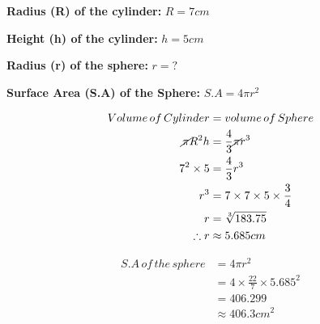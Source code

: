 \documentclass[
  a4paperpaper,
]{scrbook}
\begin{document}
\begin{tcolorbox}[enhanced jigsaw, left=2mm, colframe=quarto-callout-caution-color-frame, toptitle=1mm, opacitybacktitle=0.6, rightrule=.15mm, colbacktitle=quarto-callout-caution-color!10!white, colback=white, arc=.35mm, breakable, leftrule=.75mm, bottomtitle=1mm, bottomrule=.15mm, title=\textcolor{quarto-callout-caution-color}{\faFire}\hspace{0.5em}{Solution}, titlerule=0mm, coltitle=black, toprule=.15mm, opacityback=0]

\textbf{Radius (R) of the cylinder:} \(R= 7cm\)

\textbf{Height (h) of the cylinder:} \(h= 5 cm\)

\textbf{Radius (r) of the sphere:} \(r=?\)

\textbf{Surface Area (S.A) of the Sphere:} \(S.A = 4\pi r^{2}\)

\begin{equation}
\begin{split}
Volume\, of\, Cylinder &= volume\, of \,Sphere\\
\cancel\pi R^{2}h &= \frac{4}{3}\cancel\pi r^{3}\\
7^2\times5 &=\frac{4}{3}r^{3} \\
r^{3} &=7\times7\times5\times\frac{3}{4}\\
r &=\sqrt[3]{183.75}\\
\therefore r& \approx 5.685 cm\\
\end{split}
\end{equation}

\begin{equation}
\begin{split}
S.A\,of\,the \,sphere& = 4\pi r^{2}\\
&=4\times\frac{22}{7}\times 5.685^{2}\\
&=406.299\\
&\approx 406.3 cm^{2}
\end{split}
\end{equation}

\end{tcolorbox}
\end{document}
